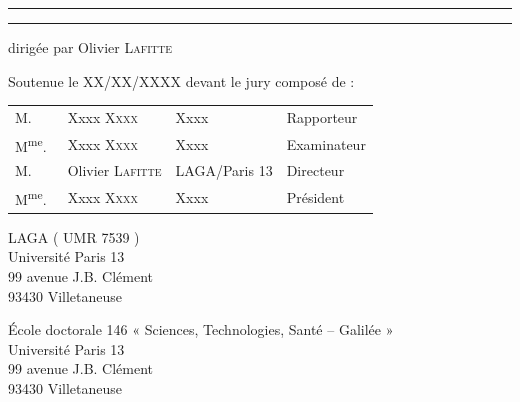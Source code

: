 \begin{titlepage}
\begin{center}
\hrule
{}
{\LARGE \textbf{\doctitle}}
\hrule

{\Large
dirigée par Olivier \textsc{Lafitte}}


{\Large Soutenue le XX/XX/XXXX devant le jury composé de :}

{\Large
\begin{tabular}{l@{\hskip 0cm}lll}
M.&Xxxx \textsc{Xxxx} & Xxxx & Rapporteur\\
M\textsuperscript{me}.~&Xxxx \textsc{Xxxx} & Xxxx & Examinateur\\
M.&Olivier \textsc{Lafitte} & LAGA/Paris 13 & Directeur\\
M\textsuperscript{me}.~&Xxxx \textsc{Xxxx} & Xxxx & Président\\
\end{tabular}
}

\end{center}

\newpage
\thispagestyle{empty}
\vspace*{\fill}

\noindent
\begin{center}
\begin{minipage}[t]{0.45\textwidth}
LAGA ( UMR 7539 )\\
Université Paris 13 \\
99 avenue J.B. Clément \\
93430 Villetaneuse
\end{minipage}%
%
\hfill%
%
\begin{minipage}[t]{0.45\textwidth}
École doctorale 146 « Sciences, Technologies, Santé – Galilée » \\
Université Paris 13 \\
99 avenue J.B. Clément \\
93430 Villetaneuse
\end{minipage}
\end{center}



\end{titlepage}
\hypersetup{pageanchor=true}

\cleardoublepage